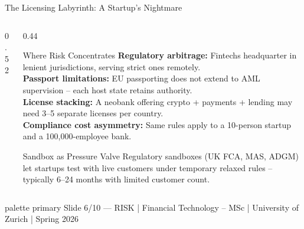 \documentclass[aspectratio=169, 11pt]{beamer}
\newcommand{\bottomnote}[1]{%
  \vfill
  \begin{beamercolorbox}[wd=\textwidth,ht=2ex,dp=1ex]{palette primary}
    \tiny\hspace{1em}#1
  \end{beamercolorbox}}
\begin{document}
\begin{frame}{The Licensing Labyrinth: A Startup's Nightmare}
\begin{columns}[T]
\begin{column}{0.52\textwidth}
\begin{center}
\end{center}
\end{column}
\begin{column}{0.44\textwidth}
\vspace{0.2em}
\begin{alertblock}{Where Risk Concentrates}
\scriptsize
\textbf{Regulatory arbitrage:} Fintechs headquarter in lenient jurisdictions, serving strict ones remotely.\\[3pt]
\textbf{Passport limitations:} EU passporting does not extend to AML supervision -- each host state retains authority.\\[3pt]
\textbf{License stacking:} A neobank offering crypto + payments + lending may need 3--5 separate licenses per country.\\[3pt]
\textbf{Compliance cost asymmetry:} Same rules apply to a 10-person startup and a 100,000-employee bank.
\end{alertblock}
\vspace{0.2em}
\begin{block}{Sandbox as Pressure Valve}
\scriptsize
Regulatory sandboxes (UK FCA, MAS, ADGM) let startups test with live customers under temporary relaxed rules -- typically 6--24 months with limited customer count.
\end{block}
\end{column}
\end{columns}
\bottomnote{Slide 6/10 --- RISK | Financial Technology -- MSc | University of Zurich | Spring 2026}
\end{frame}
\end{document}
